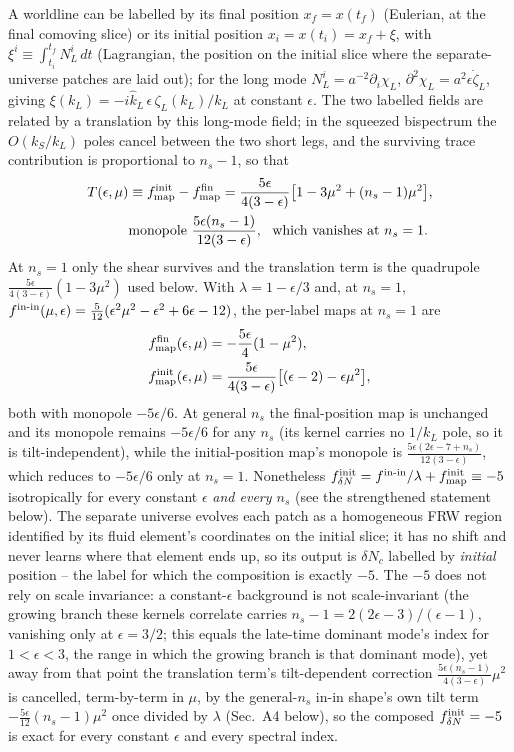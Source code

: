 \documentclass[aps,prd,twocolumn,superscriptaddress,showpacs,preprintnumbers,nofootinbib,longbibliography,floatfix]{revtex4-2}
\newcommand{\eps}{\epsilon}
\begin{document}
A worldline can be labelled by its final position $x_f=x(t_f)$ (Eulerian, at the final
comoving slice) or its initial position $x_i=x(t_i)=x_f+\xi$, with
$\xi^i\equiv\int_{t_i}^{t_f}N_L^i\,dt$ (Lagrangian, the position on the initial slice where
the separate-universe patches are laid out); for the long mode
$N_L^i=a^{-2}\partial_i\chi_L$, $\partial^2\chi_L=a^2\eps\dot\zeta_L$, giving
$\xi(k_L)=-i\hat k_L\,\eps\,\zeta_L(k_L)/k_L$ at constant $\eps$. The two labelled fields are
related by a translation by this long-mode field; in the squeezed bispectrum the
$O(k_S/k_L)$ poles cancel between the two short legs, and the surviving trace
contribution is proportional to $n_s-1$, so that
\begin{align}
T(\eps,\mu)&\equiv f_{\rm map}^{\rm init}-f_{\rm map}^{\rm fin}
=\frac{5\eps}{4(3-\eps)}\big[1-3\mu^2+(n_s-1)\mu^2\big],\\
&\text{monopole }\frac{5\eps(n_s-1)}{12(3-\eps)},\ \ \text{which vanishes at }n_s=1.\nonumber
\end{align}
At $n_s=1$ only the shear survives and the translation term is the quadrupole
$\tfrac{5\eps}{4(3-\eps)}(1-3\mu^2)$ used below.
With $\lambda=1-\eps/3$ and, at $n_s=1$,
$f^{\rm in\text{-}in}(\mu,\eps)=\tfrac{5}{12}(\eps^2\mu^2-\eps^2+6\eps-12)$,
the per-label maps at $n_s=1$ are
\begin{align}
f_{\rm map}^{\rm fin}(\eps,\mu)&=-\frac{5\eps}{4}(1-\mu^2),\\
f_{\rm map}^{\rm init}(\eps,\mu)&=\frac{5\eps}{4(3-\eps)}\big[(\eps-2)-\eps\mu^2\big],
\end{align}
both with monopole $-5\eps/6$. At general $n_s$ the final-position map is unchanged and its
monopole remains $-5\eps/6$ for any $n_s$ (its kernel carries no $1/k_L$ pole, so it is
tilt-independent), while the initial-position map's monopole is
$\tfrac{5\eps(2\eps-7+n_s)}{12(3-\eps)}$, which reduces to $-5\eps/6$ only at $n_s=1$.
Nonetheless $f_{\delta N}^{\rm init}=f^{\rm in\text{-}in}/\lambda+f_{\rm map}^{\rm init}\equiv-5$
isotropically for every constant $\eps$ \emph{and every $n_s$} (see the strengthened
statement below). The separate universe evolves each patch as a
homogeneous FRW region identified by its fluid element's coordinates on the initial slice; it
has no shift and never learns where that element ends up, so its output is $\delta N_c$
labelled by \emph{initial} position -- the label for which the composition is exactly $-5$.
The $-5$ does not rely on scale invariance: a constant-$\eps$ background is not
scale-invariant (the growing branch these kernels correlate carries
$n_s-1=2(2\eps-3)/(\eps-1)$, vanishing only at $\eps=3/2$; this equals the late-time dominant
mode's index for $1<\eps<3$, the range in which the growing branch is that dominant mode), yet
away from that point the translation term's tilt-dependent correction
$\tfrac{5\eps(n_s-1)}{4(3-\eps)}\mu^2$ is cancelled, term-by-term in $\mu$, by the general-$n_s$
in-in shape's own tilt term $-\tfrac{5\eps}{12}(n_s-1)\mu^2$ once divided by $\lambda$
(Sec.~A4 below), so the composed $f_{\delta N}^{\rm init}=-5$ is exact for every constant
$\eps$ and every spectral index.
\end{document}
